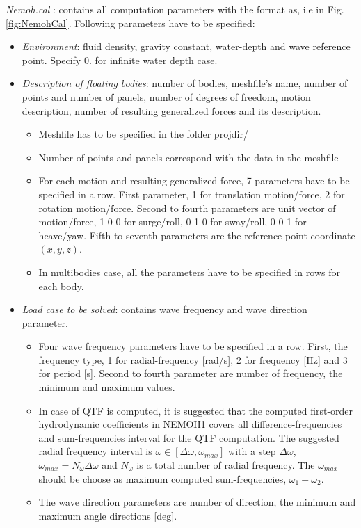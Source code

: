 \documentclass[12pt,a4paper,titlepage]{article}
\begin{document}
\emph{Nemoh.cal} : contains all computation parameters with the format as, i.e in Fig. \ref{fig:NemohCal}. Following parameters have to be specified:
\begin{itemize}
\item \emph{Environment}: fluid density, gravity constant, water-depth and wave reference point.  Specify $0.$ for infinite water depth case.
\item \emph{Description of floating bodies}: number of bodies, meshfile's name, number of points and number of panels, number of degrees of freedom, motion description, number of resulting generalized forces and its description.
\begin{itemize}
\item Meshfile has to be specified in the folder projdir/
\item Number of points and panels correspond with the data in the meshfile
\item For each motion and resulting generalized force, 7 parameters have to be specified in a row. First parameter, 1 for translation motion/force, 2 for rotation motion/force. Second to fourth parameters are unit vector of motion/force, 1 0 0 for surge/roll, 0 1 0 for sway/roll, 0 0 1 for heave/yaw. Fifth to seventh parameters are the reference point coordinate $(x,y,z)$.
\item In multibodies case, all the parameters have to be specified in rows for each body.
\end{itemize}
\item \emph{Load case to be solved}: contains wave frequency and wave direction parameter.
\begin{itemize}
\item Four wave frequency parameters have to be specified in a row. First, the frequency type, 1 for radial-frequency [rad/s], 2 for frequency [Hz] and 3 for period [s]. Second to fourth parameter are number of frequency, the minimum and maximum values.
\item In case of QTF is computed, it is suggested that the computed first-order hydrodynamic coefficients in NEMOH1 covers all difference-frequencies and sum-frequencies interval for the QTF computation. The suggested radial frequency interval is $\omega \in [\Delta \omega, \omega_{max}]$ with a step $\Delta \omega$,  $\omega_{max}=N_{\omega}\Delta \omega$ and $N_{\omega}$ is a total number of radial frequency. The $\omega_{max}$ should be choose as maximum computed sum-frequencies, $\omega_1+\omega_2$.
\item The wave direction parameters are number of direction, the minimum and maximum angle directions [deg].

\end{itemize}
\end{itemize}
\end{document}
